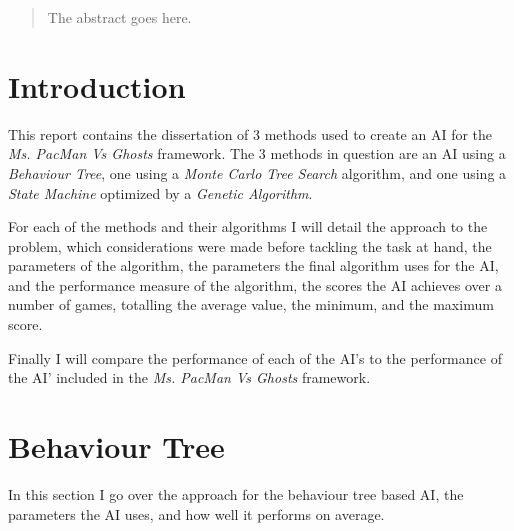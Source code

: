 \documentclass[conference,compsoc]{IEEEtran}
\begin{document}




\maketitle

\begin{abstract}
The abstract goes here.
\end{abstract}





%
\IEEEpeerreviewmaketitle



\section{Introduction}
This report contains the dissertation of 3 methods used to create an AI for the \textit{Ms. PacMan Vs Ghosts} framework.
The 3 methods in question are an AI using a \textit{Behaviour Tree}, one using a \textit{Monte Carlo Tree Search} algorithm, and one using a \textit{State Machine} optimized by a \textit{Genetic Algorithm}.

For each of the methods and their algorithms I will detail the approach to the problem, which considerations were made before tackling the task at hand, the parameters of the algorithm, the parameters the final algorithm uses for the AI, and the performance measure of the algorithm, the scores the AI achieves over a number of games, totalling the average value, the minimum, and the maximum score.

Finally I will compare the performance of each of the AI's to the performance of the AI' included in the \textit{Ms. PacMan Vs Ghosts} framework.

\section{Behaviour Tree}
In this section I go over the approach for the behaviour tree based AI, the parameters the AI uses, and how well it performs on average.
\end{document}
